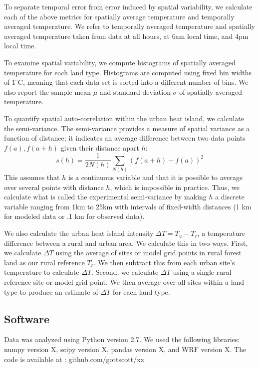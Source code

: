 \documentclass[draft,linenumbers]{agujournal}
\begin{document}
To separate temporal error from error induced by spatial variability, we calculate each of the above metrics for spatially average temperature and temporally averaged temperature. We refer to temporally averaged temperature  and spatially averaged temperature taken from data at all hours, at 6am local time, and 4pm local time. 

To examine spatial variability, we compute histograms of spatially averaged temperature for each land type. Histograms are computed using fixed bin widths of $1^\circ$C, meaning that each data set is sorted into a different number of bins. We also report the sample mean $\mu$ and standard deviation $\sigma$ of spatially averaged temperature. 

To quantify spatial auto-correlation within the urban heat island, we calculate the semi-variance. The semi-variance provides a measure of spatial variance as a function of distance; it indicates an average difference between two data points $f(a), f(a+h)$ given their distance apart $h$: 
\begin{equation}
 s(h) = \frac{1}{2 N(h)} \sum _{N(h)} \left(f(a+h) -f(a)\right)^2
\label{eq:semivariogram}
\end{equation}
This assumes that $h$ is a continuous variable and that it is possible to average over several points with distance $h$, which is impossible in practice. Thus, we calculate what is called the experimental semi-variance by making $h$ a discrete variable ranging from 1km to 25km with intervals of fixed-width distances (1 km for modeled data or .1 km for observed data). 

We also calculate the urban heat island intensity $\Delta T = T_u - T_r$, a temperature difference between a rural and urban area. We calculate this in two ways. First, we calculate $\Delta T$ using the average of sites or model grid points in rural forest land as our rural reference $T_r$. We then subtract this from each urban site's temperature to calculate $\Delta T$. 
Second, we calculate $\Delta T$ using a single rural reference site or model grid point. We then average over all sites within a land type to produce an estimate of $\Delta T$ for each land type. 

\subsection{Software}
Data was analyzed using Python version 2.7. We used the following libraries: numpy version X, scipy version X, pandas version X, and WRF version X. 
The code is available at :  github.com/gottscott/xx
\end{document}

